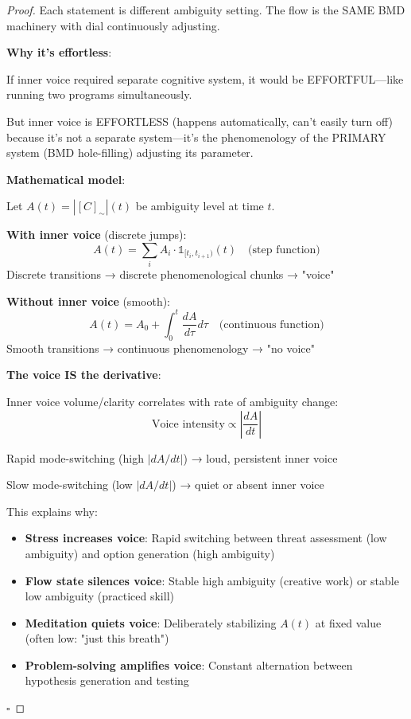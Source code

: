 \documentclass[11pt,a4paper]{article}
\begin{document}
\begin{proof}
Each statement is different ambiguity setting. The flow is the SAME BMD machinery with dial continuously adjusting.

\textbf{Why it's effortless}:

If inner voice required separate cognitive system, it would be EFFORTFUL—like running two programs simultaneously.

But inner voice is EFFORTLESS (happens automatically, can't easily turn off) because it's not a separate system—it's the phenomenology of the PRIMARY system (BMD hole-filling) adjusting its parameter.

\textbf{Mathematical model}:

Let $A(t) = |[C]_{\sim}|(t)$ be ambiguity level at time $t$.

\textbf{With inner voice} (discrete jumps):
\begin{equation}
A(t) = \sum_{i} A_i \cdot \mathbb{1}_{[t_i, t_{i+1})}(t) \quad \text{(step function)}
\end{equation}
Discrete transitions → discrete phenomenological chunks → "voice"

\textbf{Without inner voice} (smooth):
\begin{equation}
A(t) = A_0 + \int_0^t \frac{dA}{d\tau} d\tau \quad \text{(continuous function)}
\end{equation}
Smooth transitions → continuous phenomenology → "no voice"

\textbf{The voice IS the derivative}:

Inner voice volume/clarity correlates with rate of ambiguity change:
\begin{equation}
\text{Voice intensity} \propto \left| \frac{dA}{dt} \right|
\end{equation}

Rapid mode-switching (high $|dA/dt|$) → loud, persistent inner voice

Slow mode-switching (low $|dA/dt|$) → quiet or absent inner voice

This explains why:
\begin{itemize}
\item \textbf{Stress increases voice}: Rapid switching between threat assessment (low ambiguity) and option generation (high ambiguity)
\item \textbf{Flow state silences voice}: Stable high ambiguity (creative work) or stable low ambiguity (practiced skill)
\item \textbf{Meditation quiets voice}: Deliberately stabilizing $A(t)$ at fixed value (often low: "just this breath")
\item \textbf{Problem-solving amplifies voice}: Constant alternation between hypothesis generation and testing
\end{itemize}

$\square$
\end{proof}
\end{document}
